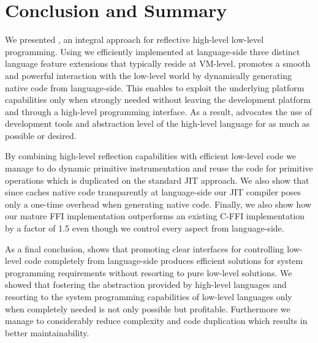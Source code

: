 \section{Conclusion and Summary}
We presented \B, an integral approach for reflective high-level low-level programming.
Using \B we efficiently implemented at language-side three distinct language feature extensions that typically reside at VM-level.
\B promotes a smooth and powerful interaction with the low-level world by dynamically generating native code from language-side.
This enables to exploit the underlying platform capabilities only when strongly needed without leaving the development platform and through a high-level programming interface. 
As a result, \B advocates the use of development tools and abstraction level of the high-level language for as much as possible or desired.

By combining high-level reflection capabilities with efficient low-level code we manage to do dynamic primitive instrumentation and reuse the code for primitive operations which is duplicated on the standard JIT approach.
We also show that since \B caches native code transparently at language-side our JIT compiler poses only a one-time overhead when generating native code. 
Finally, we also show how our mature FFI implementation outperforms an existing C-FFI implementation by a factor of 1.5 even though we control every aspect from language-side.


As a final conclusion, \B shows that promoting clear interfaces for controlling low-level code completely from language-side produces efficient solutions for system programming requirements without resorting to pure low-level solutions.
We showed that fostering the abstraction provided by high-level languages and resorting to the system programming capabilities of low-level languages only when completely needed is not only possible but profitable.
Furthermore we manage to considerably reduce complexity and code duplication which results in better maintainability.



